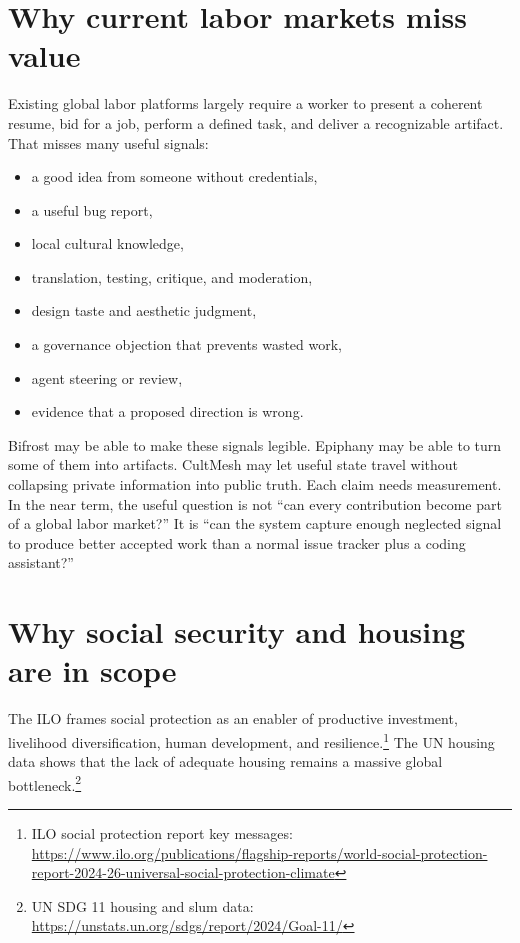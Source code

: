 \documentclass[11pt,oneside]{report}
\newcommand{\src}[2]{\footnote{#1: \url{#2}}}
\begin{document}
\section{Why current labor markets miss value}

Existing global labor platforms largely require a worker to present a coherent resume, bid for a job, perform a defined task, and deliver a recognizable artifact. That misses many useful signals:

\begin{itemize}
  \item a good idea from someone without credentials,
  \item a useful bug report,
  \item local cultural knowledge,
  \item translation, testing, critique, and moderation,
  \item design taste and aesthetic judgment,
  \item a governance objection that prevents wasted work,
  \item agent steering or review,
  \item evidence that a proposed direction is wrong.
\end{itemize}

Bifrost may be able to make these signals legible. Epiphany may be able to turn some of them into artifacts. CultMesh may let useful state travel without collapsing private information into public truth. Each claim needs measurement. In the near term, the useful question is not ``can every contribution become part of a global labor market?'' It is ``can the system capture enough neglected signal to produce better accepted work than a normal issue tracker plus a coding assistant?''

\section{Why social security and housing are in scope}

The ILO frames social protection as an enabler of productive investment, livelihood diversification, human development, and resilience.\src{ILO social protection report key messages}{https://www.ilo.org/publications/flagship-reports/world-social-protection-report-2024-26-universal-social-protection-climate} The UN housing data shows that the lack of adequate housing remains a massive global bottleneck.\src{UN SDG 11 housing and slum data}{https://unstats.un.org/sdgs/report/2024/Goal-11/}
\end{document}
